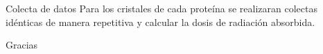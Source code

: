 \documentclass{beamer}
\begin{document}
\begin{frame}{Colecta de datos}
Para los cristales de cada proteína se realizaran colectas idénticas de manera repetitiva y calcular la dosis de radiación absorbida.
\end{frame}
\begin{frame}
\centering
Gracias
\end{frame}
\end{document}
